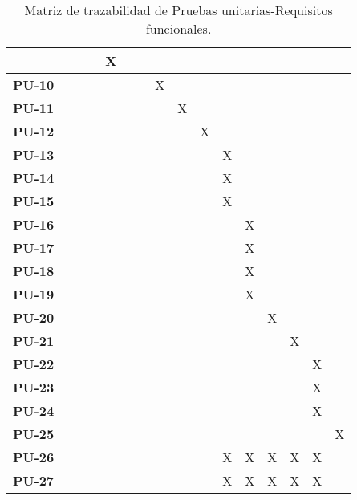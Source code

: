 \begin{table}[H]
\begin{center}
\begin{tabular}{c|c|c|c|c|c|c|c|c|c|c|c|c|c|c|c}
   &
   &
   &
   &
  X &
   &
   &
   &
   &
   &
   &
   &
   & 
   \\  \hline
\multicolumn{1}{c|}{\bf PU-10} &
   &
   &
   &
   &
   &
   &
  X &
   &
   &
   &
   &
   &
   &
   & 
   \\  \hline
\multicolumn{1}{c|}{\bf PU-11} &
   &
   &
   &
   &
   &
   &
   &
  X &
   &
   &
   &
   &
   &
   & 
   \\  \hline
\multicolumn{1}{c|}{\bf PU-12} &
   &
   &
   &
   &
   &
   &
   &
   &
  X &
   &
   &
   &
   &
   & 
   \\  \hline
\multicolumn{1}{c|}{\bf PU-13} &
   &
   &
   &
   &
   &
   &
   &
   &
   &
  X &
   &
   &
   &
   & 
   \\  \hline
\multicolumn{1}{c|}{\bf PU-14} &
   &
   &
   &
   &
   &
   &
   &
   &
   &
  X &
   &
   &
   &
   & 
   \\  \hline
\multicolumn{1}{c|}{\bf PU-15} &
   &
   &
   &
   &
   &
   &
   &
   &
   &
  X &
   &
   &
   &
   & 
   \\  \hline
\multicolumn{1}{c|}{\bf PU-16} &
   &
   &
   &
   &
   &
   &
   &
   &
   &
   &
  X &
   &
   &
   & 
   \\  \hline
\multicolumn{1}{c|}{\bf PU-17} &
   &
   &
   &
   &
   &
   &
   &
   &
   &
   &
  X &
   &
   &
   & 
   \\  \hline
\multicolumn{1}{c|}{\bf PU-18} &
   &
   &
   &
   &
   &
   &
   &
   &
   &
   &
  X &
   &
   &
   & 
   \\  \hline
\multicolumn{1}{c|}{\bf PU-19} &
   &
   &
   &
   &
   &
   &
   &
   &
   &
   &
  X &
   &
   &
   & 
   \\  \hline
\multicolumn{1}{c|}{\bf PU-20} &
   &
   &
   &
   &
   &
   &
   &
   &
   &
   &
   &
  X &
   &
   & 
   \\  \hline
\multicolumn{1}{c|}{\bf PU-21} &
   &
   &
   &
   &
   &
   &
   &
   &
   &
   &
   &
   &
  X &
   & 
   \\  \hline
\multicolumn{1}{c|}{\bf PU-22} &
   &
   &
   &
   &
   &
   &
   &
   &
   &
   &
   &
   &
   &
  X & 
   \\  \hline
\multicolumn{1}{c|}{\bf PU-23} &
   &
   &
   &
   &
   &
   &
   &
   &
   &
   &
   &
   &
   &
  X & 
   \\  \hline
\multicolumn{1}{c|}{\bf PU-24} &
   &
   &
   &
   &
   &
   &
   &
   &
   &
   &
   &
   &
   &
  X & 
   \\  \hline
\multicolumn{1}{c|}{\bf PU-25} &
   &
   &
   &
   &
   &
   &
   &
   &
   &
   &
   &
   &
   &
   & 
  X \\  \hline
\multicolumn{1}{c|}{\bf PU-26} &
   &
   &
   &
   &
   &
   &
   &
   &
   &
  X &
  X &
  X &
  X &
  X & 
   \\  \hline
\multicolumn{1}{c|}{\bf PU-27} &
   &
   &
   &
   &
   &
   &
   &
   &
   &
  X &
  X &
  X &
  X &
  X & 
   \\
\end{tabular}
\caption{Matriz de trazabilidad de Pruebas unitarias-Requisitos funcionales.}
\label{enlaceTrazabilidadUnitarias}
\end{center}
\end{table}